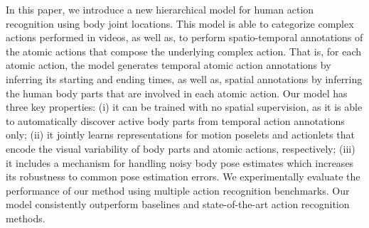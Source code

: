 In this paper, we introduce a new hierarchical model for human action
recognition using body joint locations. This model is able to categorize complex actions 
performed in videos, as well as, to perform spatio-temporal annotations of the atomic
actions that compose the underlying complex action. That is, for each atomic
action, the model generates temporal atomic action annotations by
inferring its starting and ending times, as well as,
spatial annotations by inferring the human body parts that are involved
in each atomic action. Our model has three key properties:
(i) it can be trained with no spatial
supervision, as it is able to automatically discover active body parts
from temporal action annotations only;
(ii) it jointly learns representations for motion poselets and actionlets that encode the
visual variability of body parts and atomic actions, respectively;
(iii) it includes a mechanism for handling noisy body pose estimates which increases its 
robustness to
common pose estimation errors.
We experimentally evaluate the performance of our method using multiple
action recognition benchmarks. Our model consistently outperform baselines
and state-of-the-art action recognition methods. 

